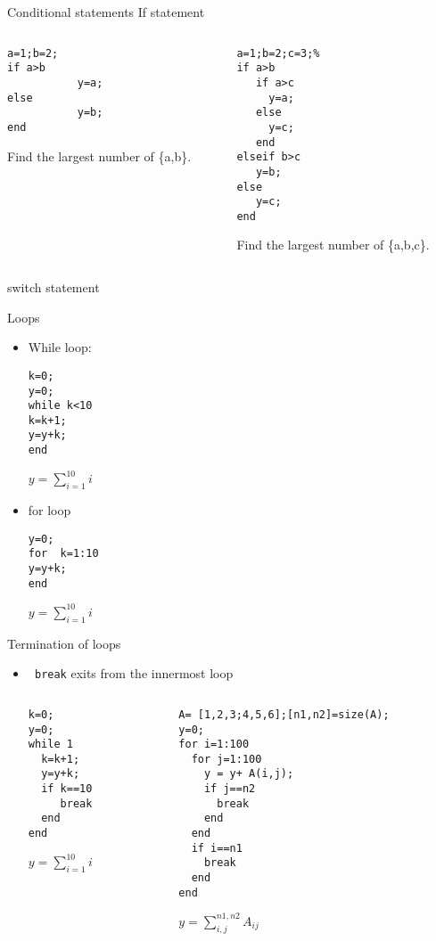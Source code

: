 \documentclass[aspectratio=169]{beamer}
\begin{document}
 \begin{frame}[containsverbatim]{Conditional statements}
      If statement
\begin{columns}
\begin{column}{0.45\linewidth}
\begin{lstlisting}
a=1;b=2;
if a>b
           y=a;
else
           y=b;
end
\end{lstlisting}
 Find the largest number of \{a,b\}.
\end{column}
 \begin{column}{0.45\linewidth}
  \begin{lstlisting}
a=1;b=2;c=3;%
if a>b
   if a>c
     y=a;
   else
     y=c;
   end
elseif b>c
   y=b;
else
   y=c;
end
\end{lstlisting}
    Find the largest number of \{a,b,c\}.
         \end{column}
           \end{columns}
      switch statement
 \end{frame}

 
 \begin{frame}[containsverbatim]{Loops}
   \begin{itemize}
     \item While loop:
\begin{lstlisting}
k=0;
y=0;
while k<10
k=k+1;
y=y+k;
end
\end{lstlisting}
           $y=\sum_{i=1}^{10}i$
     \item for loop
\begin{lstlisting}
y=0;
for  k=1:10
y=y+k;
end
\end{lstlisting}
           $y=\sum_{i=1}^{10}i$
   \end{itemize}
 \end{frame}

 \begin{frame}[containsverbatim]{Termination of loops}
   \begin{itemize}
     \item {\tt\color{red} break} exits from the innermost loop
           \begin{columns}
             \begin{column}{0.45\linewidth}
\begin{lstlisting}
k=0;
y=0;
while 1
  k=k+1;
  y=y+k;
  if k==10
     break
  end
end
\end{lstlisting}
           $y=\sum_{i=1}^{10}i$               
             \end{column}
             \begin{column}{0.45\linewidth}
\begin{lstlisting}
A= [1,2,3;4,5,6];[n1,n2]=size(A);
y=0;
for i=1:100
  for j=1:100
    y = y+ A(i,j);
    if j==n2
      break
    end
  end
  if i==n1
    break
  end
end
\end{lstlisting}
           $y=\sum_{i,j}^{n1,n2}A_{ij}$               
         \end{column}
       \end{columns}
   \end{itemize}
 \end{frame}
 
\end{document}
